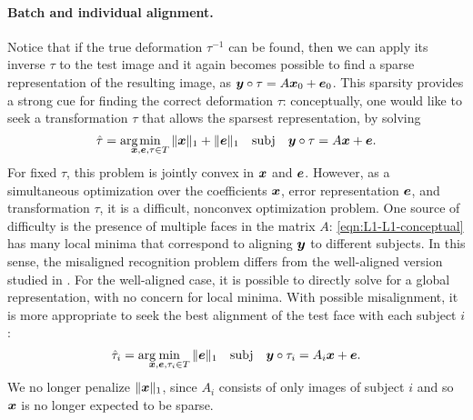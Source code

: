 \documentclass[10pt,twocolumn,letterpaper]{article}
\newcommand{\subj}{\mathrm{subj}}
\begin{document}
\paragraph{Batch and individual alignment.} Notice that if the true deformation $\tau^{-1}$ can be found, then we can apply its inverse $\tau$ to the test image and it again becomes possible to find a sparse representation of the resulting image, as ${\boldsymbol{y}} \circ \tau = A {\boldsymbol{x}}_0 + \boldsymbol{e}_0$.  This sparsity provides a strong cue for finding the correct deformation $\tau$: conceptually, one would like to seek a transformation $\tau$ that allows the sparsest representation, by solving\vspace{-1mm}
\begin{equation} \label{eqn:L1-L1-conceptual}
\hat{\tau} = \arg\hspace{-2.5mm}\min_{\x,\e,\tau \in T} \| \x \|_1 + \| \e \|_1 \quad \subj \quad \y \circ \tau = A \x + \e. \vspace{-1mm}
\end{equation}
For fixed $\tau$, this problem is jointly convex in ${\boldsymbol{x}}$ and $\boldsymbol{e}$. However, as a simultaneous optimization over the coefficients ${\boldsymbol{x}}$, error representation $\boldsymbol{e}$, and transformation $\tau$, it is a difficult, nonconvex optimization problem. One source of difficulty is the presence of multiple faces in the matrix $A$: \eqref{eqn:L1-L1-conceptual} has many local minima that correspond to aligning ${\boldsymbol{y}}$ to different subjects. In this sense, the misaligned recognition problem differs from the well-aligned version studied in \cite{Wright2008-PAMI}. For the well-aligned case, it is possible to directly solve for a global representation, with no concern for local minima. With possible misalignment, it is more appropriate to seek the best alignment of the test face with each subject $i$:\vspace{-1mm}
\begin{equation} \label{eqn:per-subject-L1}
\hat \tau_i = \arg\hspace{-2.5mm}\min_{\x,\e,\tau_i \in T} \| \e \|_1 \quad \subj \quad \y \circ \tau_i = A_i \x + \e.\vspace{-1mm}
\end{equation}
We no longer penalize $\| {\boldsymbol{x}} \|_1$, since $A_i$ consists of only images of subject $i$ and so ${\boldsymbol{x}}$ is no longer expected to be sparse.\vspace{-3mm}
\end{document}
